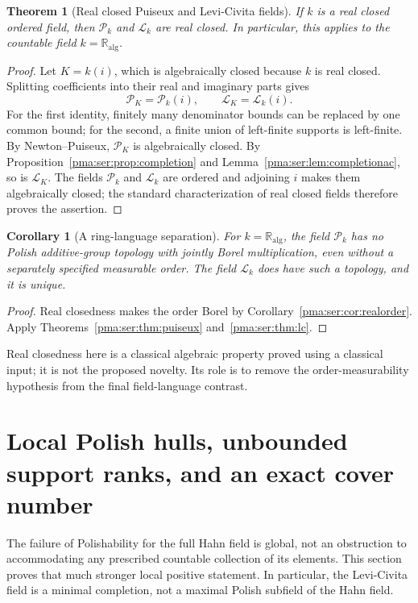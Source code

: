 \documentclass[11pt]{article}
\numberwithin{equation}{section}
\newtheorem{theorem}{Theorem}[section]
\newtheorem{corollary}[corollary]{Corollary}
\theoremstyle{definition}
\theoremstyle{remark}
\newcommand{\ka}{\mathbb R_{\mathrm{alg}}}
\newcommand{\Pk}{\mathcal P_k}
\newcommand{\Lk}{\mathcal L_k}
\begin{document}
\begin{theorem}[Real closed Puiseux and Levi-Civita fields]
\label{pma:ser:thm:rc}
If $k$ is a real closed ordered field, then $\Pk$ and $\Lk$ are real closed.
In particular, this applies to the countable field $k=\ka$.
\end{theorem}
\begin{proof}
Let $K=k(i)$, which is algebraically closed because $k$ is real closed.
Splitting coefficients into their real and imaginary parts gives
\[
 \mathcal P_K=\Pk(i),\qquad \mathcal L_K=\Lk(i).
\]
For the first identity, finitely many denominator bounds can be replaced by
one common bound; for the second, a finite union of left-finite supports is
left-finite. By Newton--Puiseux, $\mathcal P_K$ is algebraically closed.
By Proposition~\ref{pma:ser:prop:completion} and Lemma~\ref{pma:ser:lem:completionac}, so is
$\mathcal L_K$. The fields $\Pk$ and $\Lk$ are ordered and adjoining $i$
makes them algebraically closed; the standard characterization of real
closed fields therefore proves the assertion.
\end{proof}

\begin{corollary}[A ring-language separation]\label{pma:ser:cor:rclang}
For $k=\ka$, the field $\Pk$ has no Polish additive-group topology with
jointly Borel multiplication, even without a separately specified measurable
order. The field $\Lk$ does have such a topology, and it is unique.
\end{corollary}
\begin{proof}
Real closedness makes the order Borel by Corollary~\ref{pma:ser:cor:realorder}.
Apply Theorems~\ref{pma:ser:thm:puiseux} and~\ref{pma:ser:thm:lc}.
\end{proof}

Real closedness here is a classical algebraic property proved using a
classical input; it is not the proposed novelty. Its role is to remove the
order-measurability hypothesis from the final field-language contrast.

\section{Local Polish hulls, unbounded support ranks, and an exact cover number}
\label{pma:ser:sec:hulls}

The failure of Polishability for the full Hahn field is global, not an
obstruction to accommodating any prescribed countable collection of its
elements. This section proves that much stronger local positive statement.
In particular, the Levi-Civita field is a minimal completion, not a maximal
Polish subfield of the Hahn field.
\end{document}
